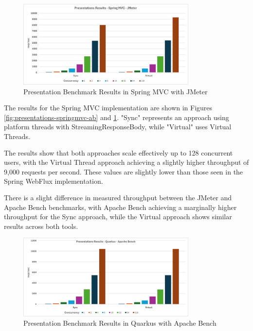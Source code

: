 \documentclass[../ppG48.tex]{subfiles}
\begin{document}
\begin{figure}[h] \centering \includegraphics[width=0.8\textwidth]{../Graphs/presentations-springmvc-jmeter.png} \caption{Presentation Benchmark Results in Spring MVC with JMeter} \label{fig:presentations-springmvc-jmeter} \end{figure}

The results for the Spring MVC implementation are shown in Figures \ref{fig:presentations-springmvc-ab} and \ref{fig:presentations-springmvc-jmeter}. "Sync" represents an approach using platform threads with StreamingResponseBody, while "Virtual" uses Virtual Threads.

The results show that both approaches scale effectively up to 128 concurrent users, with the Virtual Thread approach achieving a slightly higher throughput of 9,000 requests per second. These values are slightly lower than those seen in the Spring WebFlux implementation.

There is a slight difference in measured throughput between the JMeter and Apache Bench benchmarks, with Apache Bench achieving a marginally higher throughput for the Sync approach, while the Virtual approach shows similar results across both tools.

\begin{figure}[h]
\centering
 \includegraphics[width=0.8\textwidth]{../Graphs/presentations-quarkus-ab.png} 
 \caption{Presentation Benchmark Results in Quarkus with Apache Bench}
 \label{fig:presentations-quarkus-ab}
\end{figure}
\end{document}
